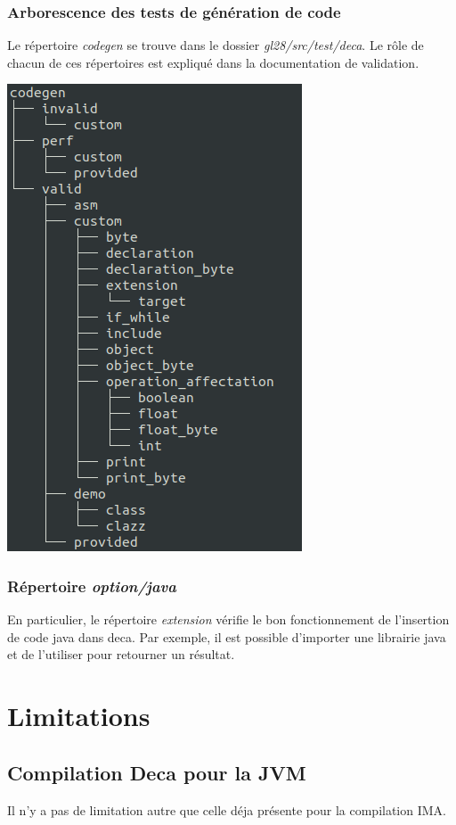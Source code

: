 \documentclass[12pt, a4paper, one side]{article}
\begin{document}
    \subsubsection{Arborescence des tests de génération de code}
    Le répertoire \textit{codegen} se trouve dans le dossier \textit{gl28/src/test/deca}. Le rôle de chacun de ces répertoires est expliqué dans la documentation de validation.
    \begin{center}
        \includegraphics[scale=0.6]{treecodegen.png}
    \end{center}

    \subsubsection{Répertoire \textit{option/java}}
    En particulier, le répertoire \textit{extension} vérifie le bon fonctionnement de l'insertion de code java dans deca. Par exemple, il est possible d'importer une librairie java et de l'utiliser pour retourner un résultat.

    \section{Limitations}
    \subsection{Compilation Deca pour la JVM}
    Il n'y a pas de limitation autre que celle déja présente pour la compilation IMA.
\end{document}
